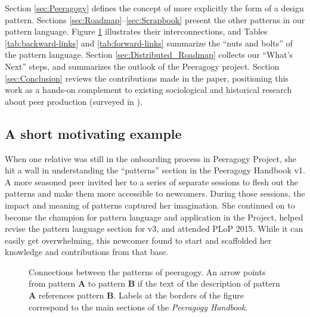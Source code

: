 Section \ref{sec:Peeragogy} defines the concept of  more explicitly the form of a design pattern.  Sections \ref{sec:Roadmap}--\ref{sec:Scrapbook} present the other patterns in our pattern language. Figure \ref{fig:connections} illustrates their interconnections, and Tables \ref{tab:backward-links} and \ref{tab:forward-links} summarize the ``nuts and bolts'' of the pattern language.
Section \ref{sec:Distributed_Roadmap} collects our ``What's Next'' steps, and summarizes the outlook of the Peeragogy project.  Section \ref{sec:Conclusion} reviews the contributions made in the paper, positioning this work as a hands-on complement to existing sociological and historical research about peer production (surveyed in \cite{benkler2015peer}).

\subsection*{A short motivating example}
When one relative  was still in the onboarding process in Peeragogy Project, she hit a wall in understanding the ``patterns'' section in the Peeragogy Handbook v1. A more seasoned peer invited her to a series of separate sessions to flesh out the patterns and make them more accessible to newcomers. During those sessions, the impact and meaning of patterns captured her imagination. She continued on to become the champion for pattern language and application in the Project, helped revise the pattern language section for v3, and attended PLoP 2015. While it can easily get overwhelming, this newcomer found  to start and scaffolded her knowledge and contributions from that base.

\begin{figure}
\vspace{-.9in}
{\centering


\par
}
\vspace{-.9in}
\caption{Connections between the patterns of peeragogy.  An arrow points from pattern \textbf{A} to pattern \textbf{B} if the text of the description of pattern \textbf{A} references pattern \textbf{B}.  Labels at the borders of the figure correspond to the main sections of the \emph{Peeragogy Handbook}.\label{fig:connections}}
\end{figure}

